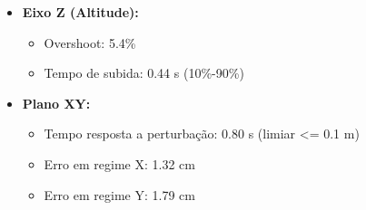 \begin{itemize}
  \item \textbf{Eixo Z (Altitude):}
  \begin{itemize}
    \item Overshoot: 5.4\%
    \item Tempo de subida: 0.44 s (10\%-90\%)
  \end{itemize}
  \item \textbf{Plano XY:}
  \begin{itemize}
    \item Tempo resposta a perturbação: 0.80 s (limiar <= 0.1 m)
    \item Erro em regime X: 1.32 cm
    \item Erro em regime Y: 1.79 cm
  \end{itemize}
\end{itemize}
